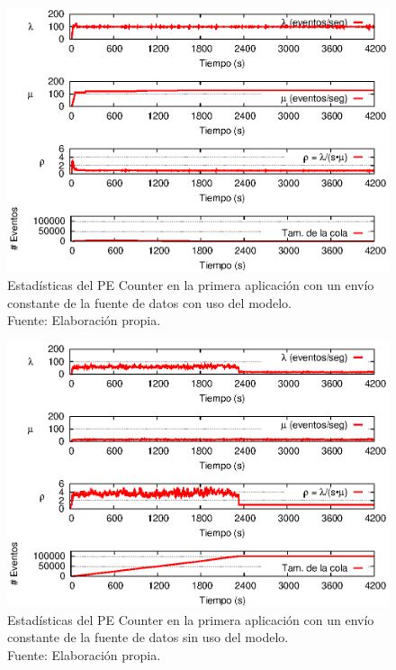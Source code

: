 \begin{figure}[!ht]
    \centering
    \captionsetup{justification=centering}
    \includegraphics[scale=1]{images/exp/app1/uniform/cm/statusCounterPE.eps}
    \caption[Estad\'isticas del PE Counter en la primera aplicaci\'on con un env\'io constante de la fuente de datos con uso del modelo.]{Estad\'isticas del PE Counter en la primera aplicaci\'on con un env\'io constante de la fuente de datos con uso del modelo.\\Fuente: Elaboraci\'on propia.}
    \label{fig:app1-uniform-statusCounterPE-cm}
\end{figure}

\begin{figure}[!ht]
    \centering
    \captionsetup{justification=centering}
    \includegraphics[scale=1]{images/exp/app1/uniform/sm/statusCounterPE.eps}
    \caption[Estad\'isticas del PE Counter en la primera aplicaci\'on con un env\'io constante de la fuente de datos sin uso del modelo.]{Estad\'isticas del PE Counter en la primera aplicaci\'on con un env\'io constante de la fuente de datos sin uso del modelo.\\Fuente: Elaboraci\'on propia.}
    \label{fig:app1-uniform-statusCounterPE-sm}
\end{figure}

